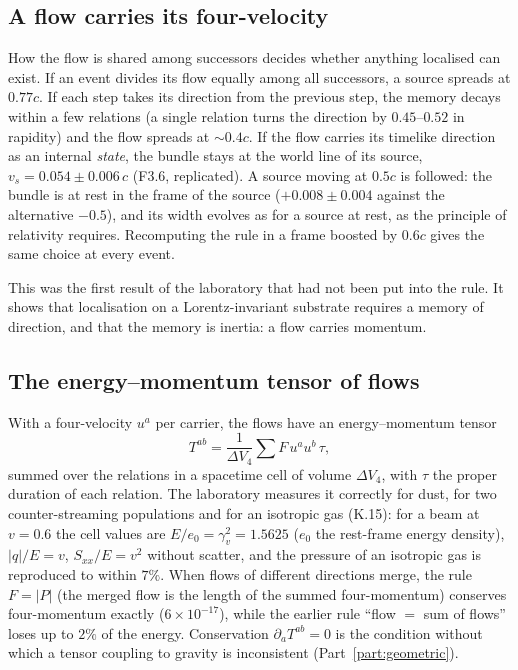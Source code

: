 \subsection{A flow carries its four-velocity}\label{sec:inertia}

How the flow is shared among successors decides whether anything localised can exist. If an event
divides its flow equally among all successors, a source spreads at $0.77c$. If each step takes its
direction from the previous step, the memory decays within a few relations (a single relation turns
the direction by $0.45$--$0.52$ in rapidity) and the flow spreads at $\sim0.4c$. If the flow carries
its timelike direction as an internal \emph{state}, the bundle stays at the world line of its
source, $v_s=0.054\pm0.006\,c$ (F3.6, replicated). A source moving at $0.5c$ is followed: the
bundle is at rest in the frame of the source ($+0.008\pm0.004$ against the alternative $-0.5$), and
its width evolves as for a source at rest, as the principle of relativity requires. Recomputing the
rule in a frame boosted by $0.6c$ gives the same choice at every event.

This was the first result of the laboratory that had not been put into the rule. It shows that
localisation on a Lorentz-invariant substrate requires a memory of direction, and that the memory
is inertia: a flow carries momentum.

\subsection{The energy--momentum tensor of flows}\label{sec:tab}

With a four-velocity $u^a$ per carrier, the flows have an energy--momentum tensor
\begin{equation}\label{eq:Tab}
  T^{ab}=\frac{1}{\Delta V_4}\sum F\,u^au^b\,\tau ,
\end{equation}
summed over the relations in a spacetime cell of volume $\Delta V_4$, with $\tau$ the proper duration
of each relation. The laboratory measures it correctly for dust, for two counter-streaming
populations and for an isotropic gas (K.15): for a beam at $v=0.6$ the cell values are
$E/e_0=\gamma_v^2=1.5625$ ($e_0$ the rest-frame energy density), $|q|/E=v$, $S_{xx}/E=v^2$ without scatter, and the pressure of an
isotropic gas is reproduced to within $7\%$. When flows of different directions merge, the rule
$F=|P|$ (the merged flow is the length of the summed four-momentum) conserves four-momentum
exactly ($6\times10^{-17}$), while the earlier rule ``flow $=$ sum of flows'' loses up to $2\%$ of
the energy. Conservation $\partial_aT^{ab}=0$ is the condition without which a tensor coupling to
gravity is inconsistent (Part~\ref{part:geometric}).

